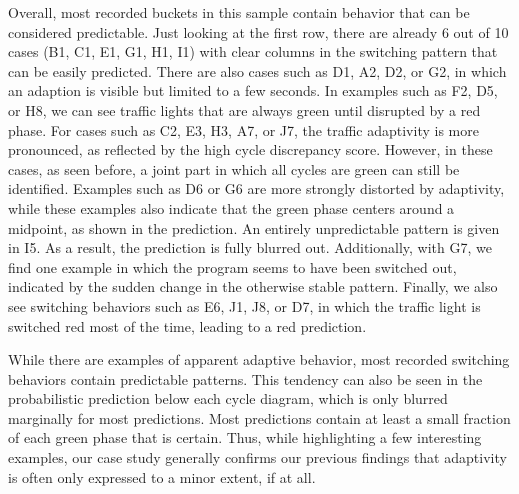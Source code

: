 Overall, most recorded buckets in this sample contain behavior that can be considered predictable. Just looking at the first row, there are already 6 out of 10 cases (B1, C1, E1, G1, H1, I1) with clear columns in the switching pattern that can be easily predicted. There are also cases such as D1, A2, D2, or G2, in which an adaption is visible but limited to a few seconds. In examples such as F2, D5, or H8, we can see traffic lights that are always green until disrupted by a red phase. For cases such as C2, E3, H3, A7, or J7, the traffic adaptivity is more pronounced, as reflected by the high cycle discrepancy score. However, in these cases, as seen before, a joint part in which all cycles are green can still be identified. Examples such as D6 or G6 are more strongly distorted by adaptivity, while these examples also indicate that the green phase centers around a midpoint, as shown in the prediction. An entirely unpredictable pattern is given in I5. As a result, the prediction is fully blurred out. Additionally, with G7, we find one example in which the program seems to have been switched out, indicated by the sudden change in the otherwise stable pattern. Finally, we also see switching behaviors such as E6, J1, J8, or D7, in which the traffic light is switched red most of the time, leading to a red prediction.

While there are examples of apparent adaptive behavior, most recorded switching behaviors contain predictable patterns. This tendency can also be seen in the probabilistic prediction below each cycle diagram, which is only blurred marginally for most predictions. Most predictions contain at least a small fraction of each green phase that is certain. Thus, while highlighting a few interesting examples, our case study generally confirms our previous findings that adaptivity is often only expressed to a minor extent, if at all.

